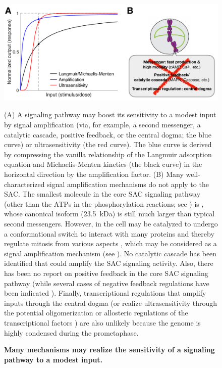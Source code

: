 \begin{figure}
    \centering
    \includegraphics[width=\textwidth]{chapters/figures/SensitivityMechanisms.pdf}
    \caption{\textbf{Many mechanisms may realize the sensitivity of a signaling pathway to a modest input.}}
    \noindent\justifying 
    (A) A signaling pathway may boost its sensitivity to a modest input by signal amplification (via, for example, a second messenger, a catalytic cascade, positive feedback, or the central dogma; the blue curve) or ultrasensitivity (the red curve). The blue curve is derived by compressing the vanilla relationship of the Langmuir adsorption equation and Michaelis-Menten kinetics (the black curve) in the horizontal direction by the amplification factor. (B) Many well-characterized signal amplification mechanisms do not apply to the SAC. The smallest molecule in the core SAC signaling pathway (other than the ATPs in the phosphorylation reactions; see ) is , whose canonical isoform (\SI{23.5}{kDa}) is still much larger than typical second messengers. However,  in the cell may be catalyzed to undergo a conformational switch to interact with many proteins and thereby regulate mitosis from various aspects \cite{Separase-SGO2-MAD2, KIF20A-MAD2}, which may be considered as a signal amplification mechanism (see ). No catalytic cascade has been identified that could amplify the SAC signaling activity. Also, there has been no report on positive feedback in the core SAC signaling pathway (while several cases of negative feedback regulations have been indicated \cite{Mps1pAutophosphorylation, PP2ADephosphorylatesBUB1, PP2ADephosphorylatesKNL1, PP2A-B56}). Finally, transcriptional regulations that amplify inputs through the central dogma (or realize ultrasensitivity through the potential oligomerization or allosteric regulations of the transcriptional factors \cite{TFMultimerization, TFAllostericRegulation}) are also unlikely because the genome is highly condensed during the prometaphase.
    \label{SensitivityMechanisms}
\end{figure}

